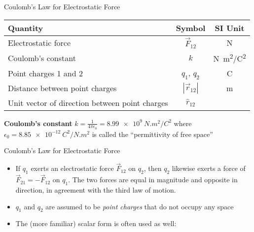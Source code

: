 \documentclass[12pt,aspectratio=169]{beamer}
\begin{document}
\begin{frame}{Coulomb's Law for Electrostatic Force}
  \begin{center}
    \begin{tabular}{l|c|c}
      \rowcolor{pink}
      \textbf{Quantity} & \textbf{Symbol} & \textbf{SI Unit} \\ \hline
      Electrostatic force    & $\vec F_{12}$ & \si\newton \\
      Coulomb's constant     & $k$          & \si{N.m^2/C^2} \\
      Point charges 1 and 2  & $q_1$, $q_2$ &  \si\coulomb \\
      Distance between point charges & $|\vec r_{12}|$ & \si\metre \\
      Unit vector of direction between point charges & $\hat r_{12}$ &
    \end{tabular}
  \end{center}

  \vspace{-.1in}\textbf{Coulomb's constant}
  $\displaystyle k=\frac1{4\pi\epsilon_0}=\SI{8.99e9}{N.m^2/C^2}$ where
  $\epsilon_0=\SI{8.85e-12}{C^2/N.m^2}$ is called the
  ``permittivity of free space''
\end{frame}



\begin{frame}{Coulomb's Law for Electrostatic Force}
  \begin{center}
  \end{center}
  \begin{itemize}
  \item\vspace{-.15in}If $q_1$ exerts an electrostatic force $\vec F_{12}$ on
    $q_2$, then $q_2$ likewise exerts a force of $\vec F_{21}=-\vec F_{12}$
    on $q_1$. The two forces are equal in magnitude and opposite in direction,
    in agreement with the third law of motion.
  \item $q_1$ and $q_2$ are assumed to be \emph{point charges} that do not
    occupy any space
  \item The (more familiar) scalar form is often used as well:

  \end{itemize}
\end{frame}
\end{document}
